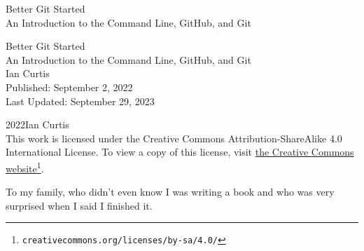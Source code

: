 \documentclass[twoside,10pt,]{book}
\makeatletter
\def\cleardoublepage{%
\clearpage\ifodd\c@page\else\thispagestyle{empty}\hbox{}\newpage\if@twocolumn\hbox{}\newpage\fi\fi%
}
\newcommand{\titlepagefont}{\relax}
\makeatother
\begin{document}
\raggedbottom
\frontmatter
\thispagestyle{empty}
{\titlepagefont\centering
\vspace*{0.28\textheight}
{\Huge Better Git Started}\\[2\baselineskip]
{\LARGE An Introduction to the Command Line, GitHub, and Git}\\
}
\clearpage
\thispagestyle{empty}
\null%
\clearpage
\thispagestyle{empty}
{\titlepagefont\centering
\vspace*{0.14\textheight}
{\Huge Better Git Started}\\[\baselineskip]
{\LARGE An Introduction to the Command Line, GitHub, and Git}\\[3\baselineskip]
{\Large Ian Curtis}\\[3\baselineskip]
{\Large Published: September 2, 2022}\\[3\baselineskip]
{\Large Last Updated: September 29, 2023}\\}
\clearpage
\thispagestyle{empty}
\label{colophon-frontmatter-b}{}\hypertarget{colophon-frontmatter-b}{}
\noindent\textcopyright{}2022\quad{}Ian Curtis\\[0.5\baselineskip]
This work is licensed under the Creative Commons Attribution-ShareAlike 4.0 International License. To view a copy of this license, visit \href{http://creativecommons.org/licenses/by-sa/4.0/}{the Creative Commons website}\footnote{\nolinkurl{creativecommons.org/licenses/by-sa/4.0/}\label{fn-frontmatter-b-a-c-b}}.\par\medskip
{}
\null\clearpage
\cleardoublepage
\thispagestyle{empty}
\begin{center}\Large%
To my family, who didn't even know I was writing a book and who was very surprised when I said I finished it.%
\end{center}
\clearpage
\end{document}
